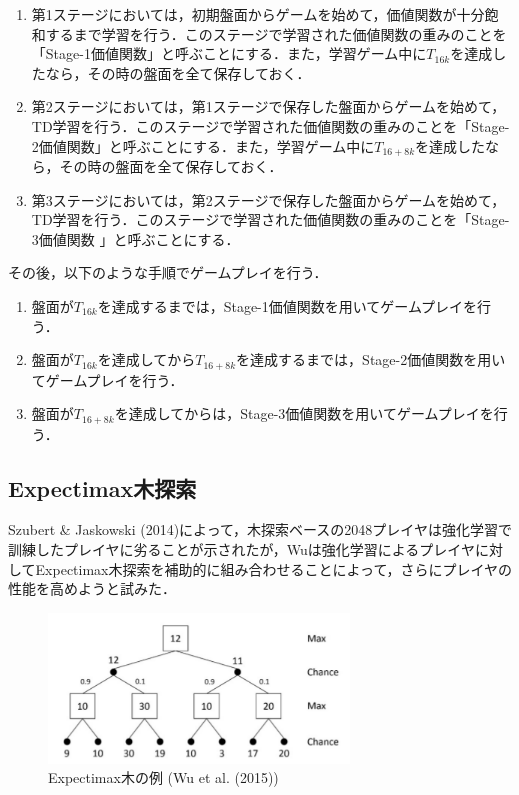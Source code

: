 \documentclass{suribt}
\begin{document}
\begin{enumerate}
\item 第1ステージにおいては，初期盤面からゲームを始めて，価値関数が十分飽和するまで学習を行う．このステージで学習された価値関数の重みのことを「Stage-1価値関数」と呼ぶことにする．また，学習ゲーム中に$T_{16k}$を達成したなら，その時の盤面を全て保存しておく．
\item 第2ステージにおいては，第1ステージで保存した盤面からゲームを始めて，TD学習を行う．このステージで学習された価値関数の重みのことを「Stage-2価値関数」と呼ぶことにする．また，学習ゲーム中に$T_{16+8k}$を達成したなら，その時の盤面を全て保存しておく．
\item 第3ステージにおいては，第2ステージで保存した盤面からゲームを始めて，TD学習を行う．このステージで学習された価値関数の重みのことを「Stage-3価値関数
」と呼ぶことにする．
\end{enumerate}

その後，以下のような手順でゲームプレイを行う．

\begin{enumerate}
\item 盤面が$T_{16k}$を達成するまでは，Stage-1価値関数を用いてゲームプレイを行う．
\item 盤面が$T_{16k}$を達成してから$T_{16+8k}$を達成するまでは，Stage-2価値関数を用いてゲームプレイを行う．
\item 盤面が$T_{16+8k}$を達成してからは，Stage-3価値関数を用いてゲームプレイを行う．
\end{enumerate}

\subsection{Expectimax木探索}
Szubert \& Jaskowski (2014)によって，木探索ベースの2048プレイヤは強化学習で訓練したプレイヤに劣ることが示されたが，Wuは強化学習によるプレイヤに対してExpectimax木探索を補助的に組み合わせることによって，さらにプレイヤの性能を高めようと試みた．

\begin{figure}[t]
	\begin{center}
	\includegraphics[width=8cm]{figure_003.png}
	\caption{Expectimax木の例 (Wu et al. (2015))}
	\label{figure_003}
	\end{center}
\end{figure}
\end{document}
